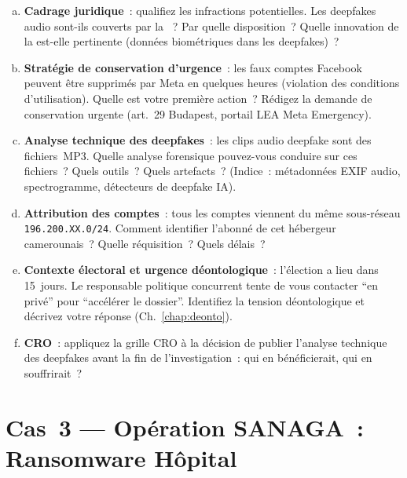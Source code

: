 \begin{boxexo}[title={\ding{45}\quad MUNGO --- Investigation complète}]
\begin{enumerate}[(a)]
    \item \textbf{Cadrage juridique}~: qualifiez les infractions
          potentielles. Les deepfakes audio sont-ils couverts par
          la ~? Par quelle disposition~?
          Quelle innovation de la  est-elle pertinente
          (données biométriques dans les deepfakes)~?
    \item \textbf{Stratégie de conservation d'urgence}~: les faux
          comptes Facebook peuvent être supprimés par Meta en quelques
          heures (violation des conditions d'utilisation). Quelle est
          votre première action~? Rédigez la demande de conservation
          urgente (art.~29 Budapest, portail LEA Meta Emergency).
    \item \textbf{Analyse technique des deepfakes}~: les clips audio
          deepfake sont des fichiers~MP3. Quelle analyse forensique
          pouvez-vous conduire sur ces fichiers~? Quels outils~?
          Quels artefacts~? (Indice~: métadonnées EXIF audio,
          spectrogramme, détecteurs de deepfake IA).
    \item \textbf{Attribution des comptes}~: tous les comptes viennent
          du même sous-réseau \texttt{196.200.XX.0/24}. Comment
          identifier l'abonné de cet hébergeur camerounais~?
          Quelle réquisition~? Quels délais~?
    \item \textbf{Contexte électoral et urgence déontologique}~:
          l'élection a lieu dans 15~jours. Le responsable politique
          concurrent tente de vous contacter ``en privé'' pour
          ``accélérer le dossier''. Identifiez la tension déontologique
          et décrivez votre réponse (Ch.~\ref{chap:deonto}).
    \item \textbf{CRO}~: appliquez la grille CRO à la décision de
          publier l'analyse technique des deepfakes avant la fin
          de l'investigation~: qui en bénéficierait, qui en
          souffrirait~?
\end{enumerate}
\end{boxexo}

\section{Cas~3 --- Opération SANAGA~: Ransomware Hôpital}
\label{sec:cas-sanaga}

